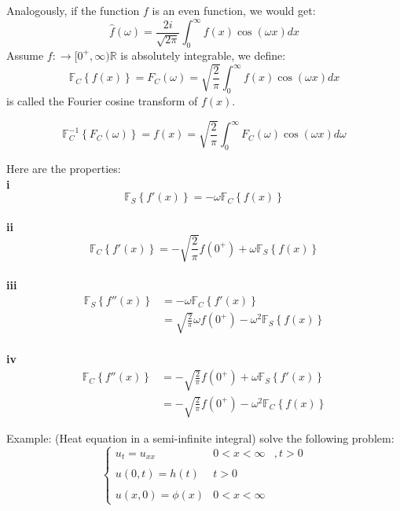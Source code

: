 \documentclass[12pt]{article} %
\begin{document}
 Analogously, if the function $f$ is an even function, we would get:
 $$
 \hat{f}(\omega) = \frac{ 2i}{\sqrt{2 \pi}}\int_{0}^{\infty} f(x) \cos(\omega x) dx 
 $$
 Assume $f: \to [0^{+}, \infty) \mathbb{R} $ is absolutely integrable, we define:
 $$
\mathbb{F}_{C}\left\{ f(x) \right\} = F_{C}(\omega) = \sqrt{\frac{2}{\pi}} \int_{0}^{\infty} f(x) \cos (\omega x) dx
$$is called the Fourier cosine transform of $f (x)$.\par
$$
\mathbb{F}_{C}^{-1}\left\{ F_{C}(\omega) \right\} =f(x) =  \sqrt{\frac{2}{\pi}} \int_{0}^{\infty} F_{C}(\omega) \cos(\omega x) d \omega
$$\par
Here are the properties:\\
\textbf{i} 
$$
\mathbb{F}_{S} \left\{ f'(x) \right\} = -\omega \mathbb{F}_{C} \left\{ f(x) \right\}
$$\\
\textbf{ii}
$$
\mathbb{F}_{C} \left\{ f'(x) \right\} = -\sqrt{\frac{2}{\pi}} f(0^{+}) + \omega \mathbb{F}_{S} \left\{ f(x) \right\}
$$ \\
\textbf{iii}
\begin{align*}
\mathbb{F}_{S} \left\{ f''(x) \right\} &= -\omega \mathbb{F}_{C} \left\{ f'(x) \right\} \\
& = \sqrt{\frac{2}{\pi}} \omega f(0^{+}) -\omega^{2} \mathbb{F}_{S} \left\{ f(x) \right\}
\end{align*} \\
\textbf{iv}
\begin{align*}
\mathbb{F}_{C} \left\{ f''(x) \right\} &= -\sqrt{\frac{2}{\pi}} f(0^{+}) + \omega \mathbb{F}_{S} \left\{ f'(x) \right\}\\
& =  -\sqrt{\frac{2}{\pi}} f(0^{+}) -\omega^{2} \mathbb{F}_{C} \left\{ f(x) \right\}
\end{align*} \par
Example: (Heat equation in a semi-infinite integral) solve the following problem:
$$
\left\{
\begin{array}{lll}
u_{t}  =  u_{xx} & 0< x < \infty &,  t >0\\
\\
u(0, t)  = h(t)  & t>0\\
\\
u(x, 0) = \phi(x) & 0< x < \infty
\end{array}\right.
$$
\end{document}
